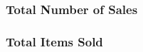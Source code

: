 \documentclass{article}
\begin{document}

                \newpage

            \subsubsection{Total Number of Sales}

            \subsubsection{Total Items Sold}
                
\end{document}
